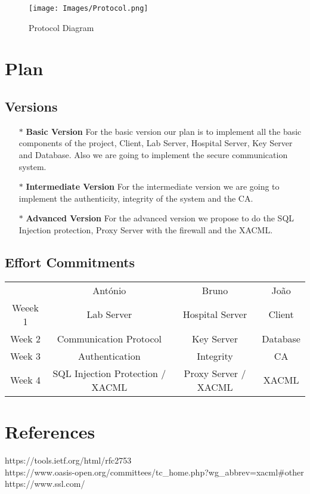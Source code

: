 \documentclass{article}
\begin{document}
\begin{figure}[!ht]
	\texttt{[image: Images/Protocol.png]}
	\caption{Protocol Diagram}
\end{figure}

\newpage
\section{Plan}
\subsection{Versions}

\begin{itemize}
\item[$\ast$] {\bf Basic Version} For the basic version our plan is to implement all the basic components of the project, Client, Lab Server, Hospital Server, Key Server and Database. Also we are going to implement the secure communication system.
\item[$\ast$] {\bf Intermediate Version} For the intermediate version we are going to implement the authenticity, integrity of the system and the CA.
\item[$\ast$] {\bf Advanced Version} For the advanced version we propose to do the SQL Injection protection, Proxy Server with the firewall and the XACML.
\end{itemize}

\subsection{Effort Commitments}

\begin{center}
\begin{tabular}{ |c|c|c|c| }
 \hline
 & António & Bruno & João \\
 Weeek 1 & Lab Server & Hospital Server & Client \\
 Week 2 & Communication Protocol & Key Server & Database\\
 Week 3 & Authentication & Integrity & CA \\
 Week 4 & SQL Injection Protection / XACML & Proxy Server / XACML & XACML \\
 \hline
\end{tabular}
\end{center}

\newpage
\section{References}

https://tools.ietf.org/html/rfc2753 \\
https://www.oasis-open.org/committees/tc_home.php?wg_abbrev=xacml#other \\
https://www.ssl.com/ \\
\end{document}
